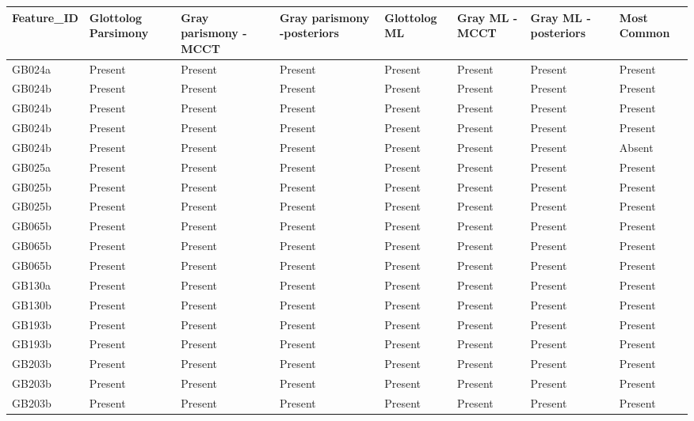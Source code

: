 \begin{longtable}{p{1.5cm}p{2.5cm}p{2.5cm}p{2.5cm}p{2.5cm}p{2.5cm}p{2.5cm}p{2.5cm}}
  \toprule
Feature\_ID & Glottolog Parsimony & Gray parismony -MCCT & Gray parismony -posteriors & Glottolog ML & Gray ML -MCCT & Gray ML -posteriors & Most Common \\ 
  \midrule
GB024a & Present & Present & Present & Present & Present & Present & Present \\ 
  GB024b & Present & Present & Present & Present & Present & Present & Present \\ 
  GB024b & Present & Present & Present & Present & Present & Present & Present \\ 
  GB024b & Present & Present & Present & Present & Present & Present & Present \\ 
  GB024b & Present & Present & Present & Present & Present & Present & Absent \\ 
  GB025a & Present & Present & Present & Present & Present & Present & Present \\ 
  GB025b & Present & Present & Present & Present & Present & Present & Present \\ 
  GB025b & Present & Present & Present & Present & Present & Present & Present \\ 
  GB065b & Present & Present & Present & Present & Present & Present & Present \\ 
  GB065b & Present & Present & Present & Present & Present & Present & Present \\ 
  GB065b & Present & Present & Present & Present & Present & Present & Present \\ 
  GB130a & Present & Present & Present & Present & Present & Present & Present \\ 
  GB130b & Present & Present & Present & Present & Present & Present & Present \\ 
  GB193b & Present & Present & Present & Present & Present & Present & Present \\ 
  GB193b & Present & Present & Present & Present & Present & Present & Present \\ 
  GB203b & Present & Present & Present & Present & Present & Present & Present \\ 
  GB203b & Present & Present & Present & Present & Present & Present & Present \\ 
  GB203b & Present & Present & Present & Present & Present & Present & Present \\ 

\end{longtable}

